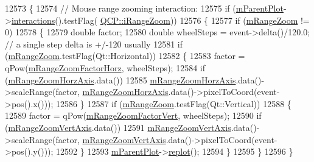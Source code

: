 \begin{DoxyCode}
12573 \{
12574   \textcolor{comment}{// Mouse range zooming interaction:}
12575   \textcolor{keywordflow}{if} (\hyperlink{class_q_c_p_layerable_aa2a528433e44db02b8aef23c1f9f90ed}{mParentPlot}->\hyperlink{class_q_custom_plot_a12401c02b6949a717f5749bb28c62983}{interactions}().testFlag(
      \hyperlink{namespace_q_c_p_a2ad6bb6281c7c2d593d4277b44c2b037abee1e94353525a636aeaf0ba32b72e14}{QCP::iRangeZoom}))
12576   \{
12577     \textcolor{keywordflow}{if} (\hyperlink{class_q_c_p_axis_rect_a215eff671d48df2edccc36e7f976f28c}{mRangeZoom} != 0)
12578     \{
12579       \textcolor{keywordtype}{double} factor;
12580       \textcolor{keywordtype}{double} wheelSteps = \textcolor{keyword}{event}->delta()/120.0; \textcolor{comment}{// a single step delta is +/-120 usually}
12581       \textcolor{keywordflow}{if} (\hyperlink{class_q_c_p_axis_rect_a215eff671d48df2edccc36e7f976f28c}{mRangeZoom}.testFlag(Qt::Horizontal))
12582       \{
12583         factor = qPow(\hyperlink{class_q_c_p_axis_rect_ad08d0250ed7b99de387d0ea6c7fd4dc1}{mRangeZoomFactorHorz}, wheelSteps);
12584         \textcolor{keywordflow}{if} (\hyperlink{class_q_c_p_axis_rect_ae22f882bab20518559f3fbb84243d0ab}{mRangeZoomHorzAxis}.data())
12585           \hyperlink{class_q_c_p_axis_rect_ae22f882bab20518559f3fbb84243d0ab}{mRangeZoomHorzAxis}.data()->scaleRange(factor, 
      \hyperlink{class_q_c_p_axis_rect_ae22f882bab20518559f3fbb84243d0ab}{mRangeZoomHorzAxis}.data()->pixelToCoord(event->pos().x()));
12586       \}
12587       \textcolor{keywordflow}{if} (\hyperlink{class_q_c_p_axis_rect_a215eff671d48df2edccc36e7f976f28c}{mRangeZoom}.testFlag(Qt::Vertical))
12588       \{
12589         factor = qPow(\hyperlink{class_q_c_p_axis_rect_a32f063629581d5bf82b12769940b34ad}{mRangeZoomFactorVert}, wheelSteps);
12590         \textcolor{keywordflow}{if} (\hyperlink{class_q_c_p_axis_rect_a8b9acd16a203a9692bd35a9465f54bc1}{mRangeZoomVertAxis}.data())
12591           \hyperlink{class_q_c_p_axis_rect_a8b9acd16a203a9692bd35a9465f54bc1}{mRangeZoomVertAxis}.data()->scaleRange(factor, 
      \hyperlink{class_q_c_p_axis_rect_a8b9acd16a203a9692bd35a9465f54bc1}{mRangeZoomVertAxis}.data()->pixelToCoord(event->pos().y()));
12592       \}
12593       \hyperlink{class_q_c_p_layerable_aa2a528433e44db02b8aef23c1f9f90ed}{mParentPlot}->\hyperlink{class_q_custom_plot_a606fd384b2a637ce2c24899bcbde77d6}{replot}();
12594     \}
12595   \}
12596 \}
\end{DoxyCode}


